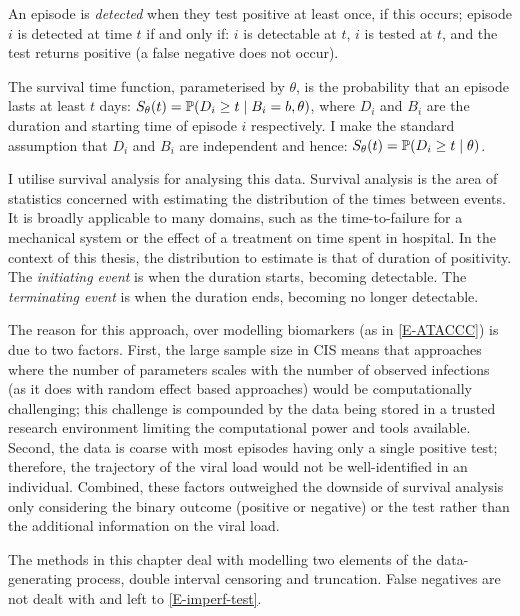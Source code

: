 \documentclass[thesis.tex]{subfiles}
\begin{document}
An episode is \emph{detected} when they test positive at least once, if this occurs; episode $i$ is detected at time $t$ if and only if: $i$ is detectable at $t$, $i$ is tested at $t$, and the test returns positive (a false negative does not occur).

The survival time function, parameterised by $\theta$, is the probability that an episode lasts at least $t$ days: $S_\theta(t) = \operatorname{\mathbb{P}}(D_i \geq t \mid B_i = b, \theta)$, where $D_i$ and $B_i$ are the duration and starting time of episode $i$ respectively.
I make the standard assumption that $D_i$ and $B_i$ are independent and hence: $S_\theta(t) = \operatorname{\mathbb{P}}(D_i \geq t \mid \theta)$.

I utilise survival analysis for analysing this data.
Survival analysis is the area of statistics concerned with estimating the distribution of the times between events.
It is broadly applicable to many domains, such as the time-to-failure for a mechanical system or the effect of a treatment on time spent in hospital.
In the context of this thesis, the distribution to estimate is that of duration of positivity.
The \emph{initiating event} is when the duration starts, \ie becoming detectable.
The \emph{terminating event} is when the duration ends, \ie becoming no longer detectable.

The reason for this approach, over modelling biomarkers (as in \cref{E-ATACCC}) is due to two factors.
First, the large sample size in CIS means that approaches where the number of parameters scales with the number of observed infections (as it does with random effect based approaches) would be computationally challenging; this challenge is compounded by the data being stored in a trusted research environment limiting the computational power and tools available.
Second, the data is coarse with most episodes having only a single positive test; therefore, the trajectory of the viral load would not be well-identified in an individual.
Combined, these factors outweighed the downside of survival analysis only considering the binary outcome (\ie positive or negative) or the test rather than the additional information on the viral load.

The methods in this chapter deal with modelling two elements of the data-generating process, double interval censoring and truncation.
False negatives are not dealt with and left to \cref{E-imperf-test}.
\end{document}
